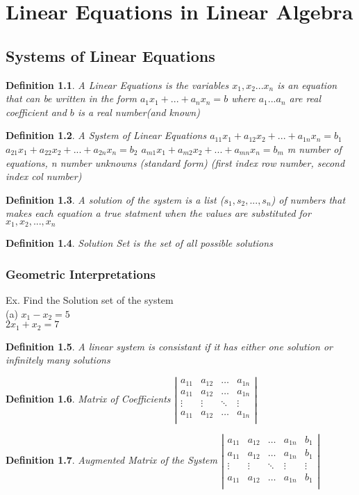 \documentclass[a4paper,12pt]{book}
\theoremstyle{defn}
\newtheorem{defn}{Definition}[section]
\begin{document}
 


\chapter{Linear Equations in Linear Algebra}
\section{Systems of Linear Equations}



\begin{defn}\textup{A Linear Equations is the variables $x_1,x_2...x_n$ is an equation that can be written in the form $a_1x_1+...+a_nx_n = b$ where $a_1 ... a_n$ are real coefficient and $b$ is a real number(and known)} \end{defn}
\begin{defn}\textup{A System of Linear Equations $a_{11}x_1+a_{12}x_2+...+a_{1n}x_n = b_1$ $a_{21}x_1+a_{22}x_2+...+a_{2n}x_n = b_2$ $a_{m1}x_1+a_{m2}x_2+...+a_{mn}x_n = b_m$ m number of equations, n number unknowns (standard form) (first index row number, second index col number)}\end{defn}
\begin{defn}\textup{A solution of the system is a list ($s_1,s_2,...,s_n$) of numbers that makes each equation a true statment when the values are substituted for $x_1,x_2,...,x_n$}\end{defn}
\begin{defn}\textup{Solution Set is the set of all possible solutions}\end{defn}

\subsection{Geometric Interpretations}
Ex. Find the Solution set of the system \\
(a) $x_1 - x_2= 5$ \\
     $2x_1 + x_2 = 7$

\begin{defn}\textup{A linear system is consistant if it has either one solution or infinitely many solutions}\end{defn}

\begin{defn}\textup{Matrix of Coefficients} 
$\left| \begin{array}{cccc}
a_{11} & a_{12} & \ldots & a_{1n}\\
a_{11} & a_{12} & \ldots & a_{1n}\\
\vdots &\vdots&\ddots& \vdots\\
a_{11} & a_{12} & \ldots & a_{1n}\\
\end{array} \right|$ \end{defn}


\begin{defn}\textup{Augmented Matrix of the System}
$\left| \begin{array}{cccc|c}
a_{11} & a_{12} & \ldots & a_{1n} & b_1\\
a_{11} & a_{12} & \ldots & a_{1n} & b_1\\
\vdots &\vdots&\ddots& \vdots &\vdots\\
a_{11} & a_{12} & \ldots & a_{1n} & b_1\\
\end{array} \right|$ \end{defn}
\end{document}
